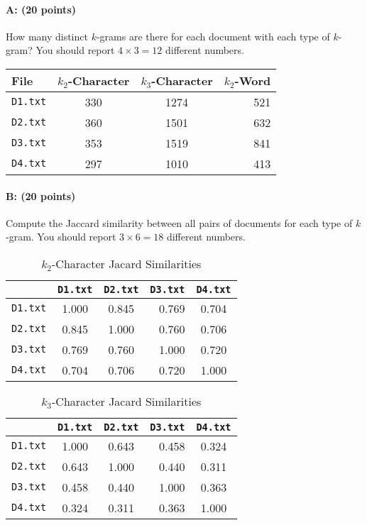 \documentclass[11pt]{article}
\begin{document}
\paragraph{A: (20 points)}  How many distinct $k$-grams are there for each document with each type of $k$-gram?    You should report $4 \times 3 = 12$ different numbers.  

\begin{table}[H]
\centering
\begin{tabular}{lccr}
\hline\hline
{\bf File} & {\bf $k_{2}$-Character} & {\bf $k_{3}$-Character} & {\bf $k_{2}$-Word}\\
\hline
{\tt D1.txt} & 330 & 1274 & 521\\
{\tt D2.txt} & 360 & 1501 & 632\\
{\tt D3.txt} & 353 & 1519 & 841\\
{\tt D4.txt} & 297 & 1010 & 413\\
\hline\hline
\end{tabular}
\end{table}


\paragraph{B: (20 points)}  Compute the Jaccard similarity between all pairs of documents for each type of $k$-gram.  You should report $3 \times 6 = 18$ different numbers.  

\begin{table}[H]
\centering
\caption{$k_{2}$-Character Jacard Similarities}
\begin{tabular}{l|ccrc}
\hline\hline
& {\tt D1.txt} &{\tt D2.txt} &{\tt D3.txt} &{\tt D4.txt} \\
\hline
{\tt D1.txt} &1.000& 0.845& 0.769& 0.704\\
{\tt D2.txt} &0.845& 1.000& 0.760& 0.706\\
{\tt D3.txt} &0.769& 0.760& 1.000& 0.720\\
{\tt D4.txt} &0.704& 0.706& 0.720& 1.000\\
\hline\hline
\end{tabular}
\end{table}


\begin{table}[H]
\centering
\caption{$k_{3}$-Character Jacard Similarities}
\begin{tabular}{l|ccrc}
\hline\hline
& {\tt D1.txt} &{\tt D2.txt} &{\tt D3.txt} &{\tt D4.txt} \\
\hline
{\tt D1.txt} &1.000& 0.643& 0.458& 0.324\\
{\tt D2.txt} &0.643& 1.000& 0.440& 0.311\\
{\tt D3.txt} &0.458& 0.440& 1.000& 0.363\\
{\tt D4.txt} &0.324& 0.311& 0.363& 1.000\\
\hline\hline
\end{tabular}
\end{table}
\end{document}
